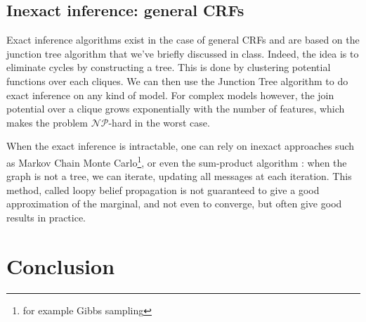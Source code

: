\documentclass[a4paper, 11pt]{article}
\begin{document}
\subsection{Inexact inference: general CRFs}
Exact inference algorithms exist in the case of general CRFs and are
based on the junction tree algorithm that we've briefly discussed in
class. Indeed, the idea is to eliminate cycles by constructing a
tree. This is done by clustering potential functions over each
cliques. We can then use the Junction Tree algorithm to do exact
inference on any kind of model. For complex models however, the join
potential over a clique grows exponentially with the number of
features, which makes the problem $\mathcal{N}\mathcal{P}$-hard in the
worst case.


When the exact inference is intractable, one can rely on inexact
approaches such as Markov Chain Monte Carlo\footnote{for example Gibbs
  sampling}, or even the sum-product algorithm : when the graph is not
a tree, we can iterate, updating all messages at each iteration. This
method, called loopy belief propagation is not guaranteed to give a
good approximation of the marginal, and not even to converge, but
often give good results in practice.




\section{Conclusion}


\end{document}
